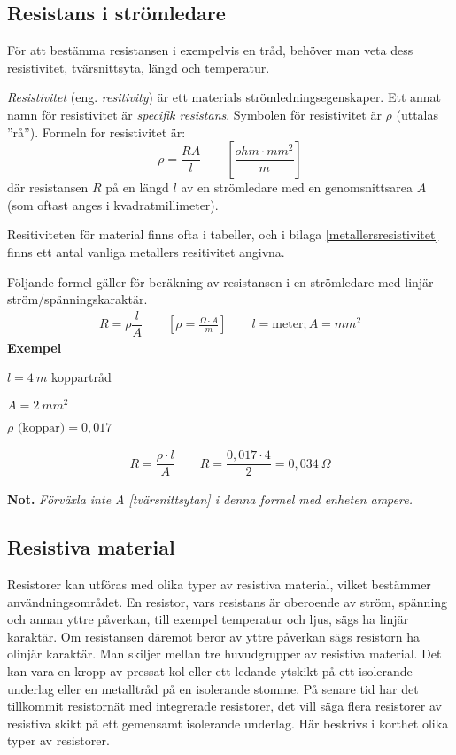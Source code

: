 \subsection{Resistans i strömledare}

För att bestämma resistansen i exempelvis en tråd, behöver man veta dess 
resistivitet, tvärsnittsyta, längd och temperatur.

\emph{Resistivitet} (eng. \emph{resitivity}) är ett materials
strömledningsegenskaper.
Ett annat namn för resistivitet är \emph{specifik resistans}.
Symbolen för resistivitet är \(\rho\) (uttalas ''rå'').
Formeln for resistivitet är:
\[\rho = \dfrac{R A}{l}\qquad \left[\dfrac{ohm \cdot mm^2}{m}\right]\]
där resistansen \(R\) på en längd \(l\) av en strömledare med en
genomsnittsarea \(A\) (som oftast anges i kvadratmillimeter).

Resitiviteten för material finns ofta i tabeller, och i bilaga
\ref{metallersresistivitet} finns ett antal vanliga metallers resitivitet
angivna.

Följande formel gäller för beräkning av resistansen i en strömledare med
linjär ström/spänningskaraktär.
\[\begin{array}{c}
    R = \rho \dfrac{l}{A} \qquad \left[\rho = \frac{\Omega \cdot A}{m} \right] \qquad l=\text{meter}; A=mm^2
\end{array}\]
\noindent
\textbf{Exempel}

\(l = 4\ m\) koppartråd

\(A = 2\ mm^2\)

\(\rho \text{ (koppar)} = 0,017\)

\[\begin{array}{c}
R = \dfrac{\rho \cdot l}{A} \qquad R = \dfrac{0,017 \cdot 4}{2} = 0,034\ \Omega
\end{array}\]

\noindent
\textbf{Not.} \emph{Förväxla inte A [tvärsnittsytan] i denna formel med enheten ampere.}

\subsection{Resistiva material}

Resistorer kan utföras med olika typer av resistiva material, vilket bestämmer
användningsområdet. En resistor, vars resistans är oberoende av ström, spänning
och annan yttre påverkan, till exempel temperatur och ljus, sägs ha linjär karaktär.
Om resistansen däremot beror av yttre påverkan sägs resistorn ha olinjär
karaktär. Man skiljer mellan tre huvudgrupper av resistiva material. Det kan
vara en kropp av pressat kol eller ett ledande ytskikt på ett isolerande
underlag eller en metalltråd på en isolerande stomme. På senare tid har det
tillkommit resistornät med integrerade resistorer, det vill säga flera resistorer av
resistiva skikt på ett gemensamt isolerande underlag. Här beskrivs i korthet
olika typer av resistorer.

